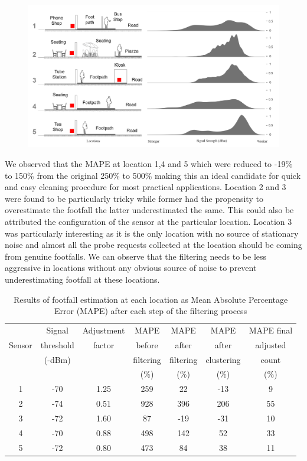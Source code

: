 \begin{figure}
  \includegraphics{images/processing-pilot-signal.png}
  \caption{}
  \label{figure:processing:pilot:signal}
\end{figure}

We observed that the MAPE at location 1,4 and 5 which were reduced to -19\% to 150\% from the original 250\% to 500\% making this an ideal candidate for quick and easy cleaning procedure for most practical applications.
Location 2 and 3 were found to be particularly tricky while former had the propensity to overestimate the footfall the latter underestimated the same.
This could also be attributed the configuration of the sensor at the particular location.
Location 3 was particularly interesting as it is the only location with no source of stationary noise and almost all the probe requests collected at the location should be coming from genuine footfalls.
We can observe that the filtering needs to be less aggressive in locations without any obvious source of noise to prevent underestimating footfall at these locations.

\begin{centering}
\begin{table}
\footnotesize
\caption{Results of footfall estimation at each location as Mean Absolute Percentage Error (MAPE) after each step of the filtering process}
{\begin{tabular}{ccccccc} 
\toprule
& Signal    & Adjustment & MAPE      & MAPE      & MAPE       & MAPE final \\
Sensor  & threshold & factor     & before    & after     & after    & adjusted\\
& (-dBm)    &            & filtering & filtering & clustering & count\\
&           &            & (\%)      & (\%)      & (\%)       & (\%)\\
\midrule
1 & -70 & 1.25 & 259 &  22 & -13 &  9 \\
2 & -74 & 0.51 & 928 & 396 & 206 & 55 \\
3 & -72 & 1.60 &  87 & -19 & -31 & 10 \\
4 & -70 & 0.88 & 498 & 142 &  52 & 33 \\
5 & -72 & 0.80 & 473 &  84 &  38 & 11 \\
\bottomrule
\end{tabular}}
\label{table:processing:pilot:results}
\end{table}
\end{centering}

